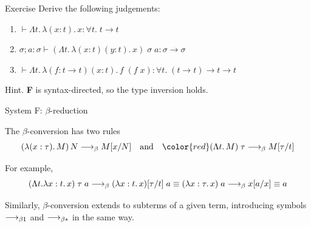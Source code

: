 \begin{frame}{Exercise}
  Derive the following judgements:
  \begin{enumerate}
    \item ${}\vdash\Lambda t.\,\lambda (x : t).\, x : \forall t.\;t\to t$
    \item $\sigma ; a : \sigma
      \vdash (\Lambda t.\, \lambda (x : t)(y : t).\, x)\;\sigma\;a
      : \sigma \to \sigma$
    \item ${}\vdash\Lambda t.\, \lambda (f : t \to t)(x : t).\, f\;(f\;x) :
      \forall t.\;(t\to t) \to t\to t$
    \end{enumerate}
  Hint. \textbf{F} is syntax-directed, so the type inversion holds. 
  
\end{frame}

\begin{frame}{System F: $\beta$-reduction}
  
The $\beta$-conversion has two rules
\[
  (\lambda (x : \tau).\, M)\,N \longrightarrow_{\beta}
  M\subst{x}{N}
  \quad\text{and}\quad
  \color{red} (\Lambda t.\, M)\;\tau \longrightarrow_{\beta} M \subst{\tau}{t}
\]

For example, 
\[
  (\Lambda t.\lambda x : t.\, x)\; \tau\; a
  \longrightarrow_\beta 
  (\lambda x : t.\, x)[{\tau}/{t}]\;a
  \equiv 
  (\lambda x : \tau.\, x)\;a
  \longrightarrow_\beta 
  x[{a}/{x}]
  \equiv a
\]

Similarly, $\beta$-conversion extends to subterms of a given term, introducing symbols $\longrightarrow_{\beta1}$ and $\longrightarrow_{\beta*}$ in the same way.
\end{frame}


